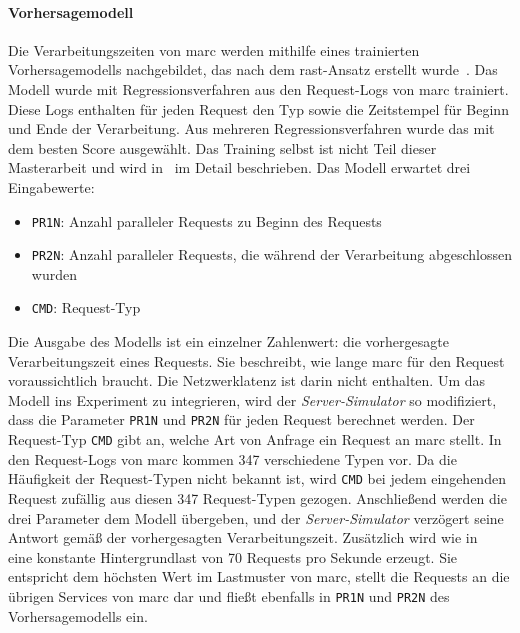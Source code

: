 \paragraph{Vorhersagemodell}

Die Verarbeitungszeiten von \gls{marc} werden mithilfe eines trainierten Vorhersagemodells nachgebildet, das nach dem \gls{rast}-Ansatz erstellt wurde~\citep{rast22, rast25}. Das Modell wurde mit Regressionsverfahren aus den Request-Logs von \gls{marc} trainiert. Diese Logs enthalten für jeden Request den Typ sowie die Zeitstempel für Beginn und Ende der Verarbeitung. Aus mehreren Regressionsverfahren wurde das mit dem besten Score ausgewählt. Das Training selbst ist nicht Teil dieser Masterarbeit und wird in~\citep{rast22, rast25} im Detail beschrieben. Das Modell erwartet drei Eingabewerte:

\begin{itemize}
    \item \texttt{PR1N}: Anzahl paralleler Requests zu Beginn des Requests
    \item \texttt{PR2N}: Anzahl paralleler Requests, die während der Verarbeitung abgeschlossen wurden
    \item \texttt{CMD}: Request-Typ
\end{itemize}

Die Ausgabe des Modells ist ein einzelner Zahlenwert: die vorhergesagte Verarbeitungszeit eines Requests. Sie beschreibt, wie lange \gls{marc} für den Request voraussichtlich braucht. Die Netzwerklatenz ist darin nicht enthalten. Um das Modell ins Experiment zu integrieren, wird der \textit{Server-Simulator} so modifiziert, dass die Parameter \texttt{PR1N} und \texttt{PR2N} für jeden Request berechnet werden. Der Request-Typ \texttt{CMD} gibt an, welche Art von Anfrage ein Request an \gls{marc} stellt. In den Request-Logs von \gls{marc} kommen 347 verschiedene Typen vor. Da die Häufigkeit der Request-Typen nicht bekannt ist, wird \texttt{CMD} bei jedem eingehenden Request zufällig aus diesen 347 Request-Typen gezogen. Anschließend werden die drei Parameter dem Modell übergeben, und der \textit{Server-Simulator} verzögert seine Antwort gemäß der vorhergesagten Verarbeitungszeit. Zusätzlich wird wie in~\citep{rast22} eine konstante Hintergrundlast von 70 Requests pro Sekunde erzeugt. Sie entspricht dem höchsten Wert im Lastmuster von \gls{marc}, stellt die Requests an die übrigen Services von \gls{marc} dar und fließt ebenfalls in \texttt{PR1N} und \texttt{PR2N} des Vorhersagemodells ein.

